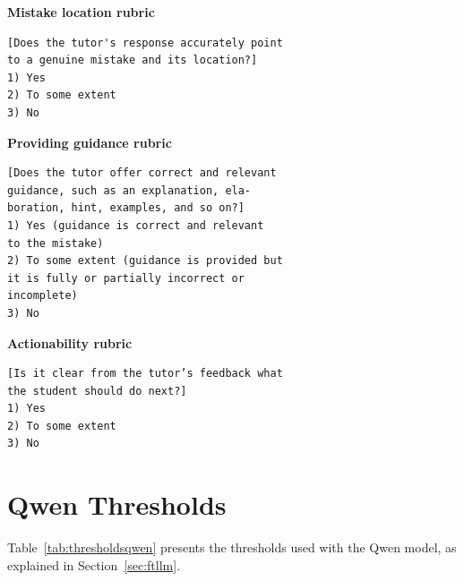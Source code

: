 \documentclass[11pt]{article}
\begin{document}
\noindent\textbf{Mistake location rubric}

\begin{verbatim}
[Does the tutor's response accurately point
to a genuine mistake and its location?]
1) Yes
2) To some extent
3) No
\end{verbatim}

\noindent\textbf{Providing guidance rubric}

\begin{verbatim}
[Does the tutor offer correct and relevant
guidance, such as an explanation, ela-
boration, hint, examples, and so on?]
1) Yes (guidance is correct and relevant
to the mistake)
2) To some extent (guidance is provided but
it is fully or partially incorrect or 
incomplete)
3) No
\end{verbatim}

\noindent\textbf{Actionability rubric}

\begin{verbatim}
[Is it clear from the tutor’s feedback what
the student should do next?]
1) Yes
2) To some extent
3) No
\end{verbatim}

\section{Qwen Thresholds}
\label{sec:appendix_thresholds}

Table~\ref{tab:thresholdsqwen} presents the thresholds used with the Qwen model, as explained in Section~\ref{sec:ftllm}.

\begin{table}[h!]
\centering
{}
\caption{Threshold-based classification rules for each evaluation dimension using Qwen. TSE = "To some extent".}
\label{tab:thresholdsqwen}
\end{table}
\end{document}
